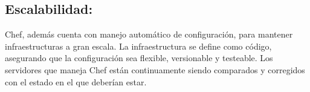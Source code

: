 \documentclass[12pt,letterpaper]{article}
\begin{document}
\subsection{Escalabilidad:}
Chef, además cuenta con manejo automático de configuración, para mantener infraestructuras a gran escala. La infraestructura se define como código, asegurando que la configuración sea flexible, versionable y testeable. Los servidores que maneja Chef están continuamente siendo comparados y corregidos con el estado en el que deberían estar. 
\end{document}
